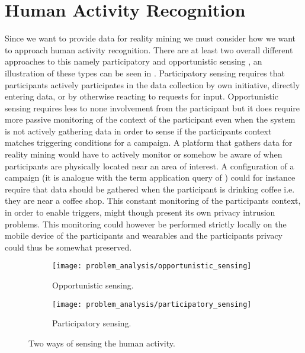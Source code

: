 
\section{Human Activity Recognition}
\label{sec:human_activity_recognition}

Since we want to provide data for reality mining we must consider how we want to approach human activity recognition. There are at least two overall different approaches to this namely participatory and opportunistic sensing \parencite{opp_or_par} \parencite{har_wearables}, an illustration of these types can be seen in . Participatory sensing requires that participants actively participates in the data collection by own initiative, directly entering data, or by otherwise reacting to requests for input. Opportunistic sensing requires less to none involvement from the participant but it does require more passive monitoring of the context of the participant even when the system is not actively gathering data in order to sense if the participants context matches triggering conditions for a campaign. A platform that gathers data for reality mining would have to actively monitor or somehow be aware of when participants are physically located near an area of interest. A configuration of a campaign (it is analogue with the term application query of \parencite{opp_or_par}) could for instance require that data should be gathered when the participant is drinking coffee i.e. they are near a coffee shop. This constant monitoring of the participants context, in order to enable triggers, might though present its own privacy intrusion problems. This monitoring could however be performed strictly locally on the mobile device of the participants and wearables and the participants privacy could thus be somewhat preserved.

\begin{figure}[!htbp]
\begin{subfigure}[!t]{.5\textwidth}
  \centering
  \texttt{[image: problem\_analysis/opportunistic\_sensing]}
  \caption{Opportunistic sensing.}
  \label{fig:opportunistic_sensing}
\end{subfigure}%
\begin{subfigure}[!t]{.5\textwidth}
  \centering
  \texttt{[image: problem\_analysis/participatory\_sensing]}
  \caption{Participatory sensing.}
  \label{fig:participatory_sensing}
\end{subfigure}
\caption{Two ways of sensing the human activity.}
\label{fig:sensing_types}
\end{figure}


